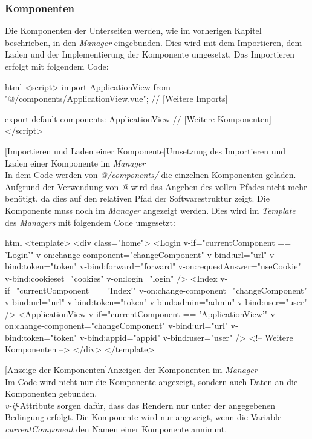 \subsubsection{Komponenten}
Die Komponenten der Unterseiten werden, wie im vorherigen Kapitel beschrieben, in den \textit{Manager} eingebunden. Dies wird mit dem Importieren, dem Laden und der Implementierung der Komponente umgesetzt.
Das Importieren erfolgt mit folgendem Code:
\begin{code}{html}
	<script>
	import ApplicationView from "@/components/ApplicationView.vue";
	// [Weitere Imports]
	
	export default {
		components: {
			ApplicationView
			// [Weitere Komponenten]
		}
	}
</script>
\end{code}
[Importieren und Laden einer Komponente]{Umsetzung des Importieren und Laden einer Komponente im \textit{Manager}}~\\
In dem Code werden von \textit{@/components/} die einzelnen Komponenten geladen. Aufgrund der Verwendung von \textit{@} wird das Angeben des vollen Pfades nicht mehr benötigt, da dies auf den relativen Pfad der Softwarestruktur zeigt.
\newpage
Die Komponente muss noch im \textit{Manager} angezeigt werden. Dies wird im \textit{Template} des \textit{Managers} mit folgendem Code umgesetzt:
\begin{code}{html}
<template>
	<div class="home">
		<Login
			v-if="currentComponent == 'Login'"
			v-on:change-component="changeComponent"
			v-bind:url="url"
			v-bind:token="token"
			v-bind:forward="forward"
			v-on:requestAnswer="useCookie"
			v-bind:cookieset="cookies"
			v-on:login="login"
		/>
		<Index
			v-if="currentComponent == 'Index'"
			v-on:change-component="changeComponent"
			v-bind:url="url"
			v-bind:token="token"
			v-bind:admin="admin"
			v-bind:user="user"
		/>
		<ApplicationView
			v-if="currentComponent == 'ApplicationView'"
			v-on:change-component="changeComponent"
			v-bind:url="url"
			v-bind:token="token"
			v-bind:appid="appid"
			v-bind:user="user"
		/>
		<!-- Weitere Komponenten -->
	</div>
</template>
\end{code}
[Anzeige der Komponenten]{Anzeigen der Komponenten im \textit{Manager}}~\\
Im Code wird nicht nur die Komponente angezeigt, sondern auch Daten an die Komponenten gebunden.\\
\textit{v-if}-Attribute sorgen dafür, dass das Rendern nur unter der angegebenen Bedingung erfolgt. Die Komponente wird nur angezeigt, wenn die Variable \textit{currentComponent} den Namen einer Komponente annimmt.\\
